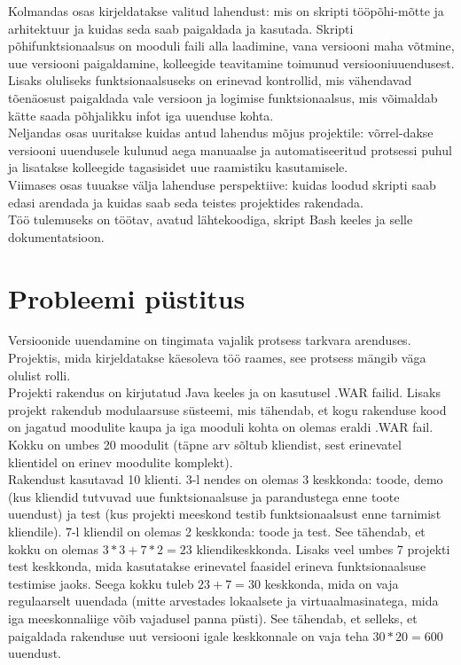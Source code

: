 \documentclass[12pt]{report}
\begin{document}
  Kolmandas osas kirjeldatakse valitud lahendust: mis on skripti tööpõhi-mõtte ja arhitektuur ja kuidas seda saab paigaldada ja kasutada. Skripti põhifunktsionaalsus on mooduli faili alla laadimine, vana versiooni maha võtmine, uue versiooni paigaldamine, kolleegide teavitamine toimunud versiooniuuendusest. Lisaks oluliseks funktsionaalsuseks on erinevad kontrollid, mis vähendavad tõenäosust paigaldada vale versioon ja logimise funktsionaalsus, mis võimaldab kätte saada põhjalikku infot iga uuenduse kohta.\\
  
  Neljandas osas uuritakse kuidas antud lahendus mõjus projektile: võrrel-dakse versiooni uuendusele kulunud aega manuaalse ja automatiseeritud protsessi puhul ja lisatakse kolleegide tagasisidet uue raamistiku kasutamisele.\\
  
  Viimases osas tuuakse välja lahenduse perspektiive: kuidas loodud skripti saab edasi arendada ja kuidas saab seda teistes projektides rakendada.\\
  
  Töö tulemuseks on töötav, avatud lähtekoodiga, skript Bash keeles ja selle dokumentatsioon.
  
  \newpage
  
  \section{Probleemi püstitus}
  
  Versioonide uuendamine on tingimata vajalik protsess tarkvara arenduses. Projektis, mida kirjeldatakse käesoleva töö raames, see protsess mängib väga olulist rolli.\\
  
  Projekti rakendus on kirjutatud Java keeles ja on kasutusel .WAR failid. Lisaks projekt rakendub modulaarsuse süsteemi, mis tähendab, et kogu rakenduse kood on jagatud moodulite kaupa ja iga mooduli kohta on olemas eraldi .WAR fail. Kokku on umbes 20 moodulit (täpne arv sõltub kliendist, sest erinevatel klientidel on erinev moodulite komplekt).\\
  
  Rakendust kasutavad 10 klienti. 3-l nendes on olemas 3 keskkonda: toode, demo (kus kliendid tutvuvad uue funktsionaalsuse ja parandustega enne toote uuendust) ja test (kus projekti meeskond testib funktsionaalsust enne tarnimist kliendile). 7-l kliendil on olemas 2 keskkonda: toode ja test. See tähendab, et kokku on olemas $3*3+7*2=23$ kliendikeskkonda. Lisaks veel umbes 7 projekti test keskkonda, mida kasutatakse erinevatel faasidel erineva funktsionaalsuse testimise jaoks. Seega kokku tuleb $23+7=30$ keskkonda, mida on vaja regulaarselt uuendada (mitte arvestades lokaalsete ja virtuaalmasinatega, mida iga meeskonnaliige võib vajadusel panna püsti). See tähendab, et selleks, et paigaldada rakenduse uut versiooni igale keskkonnale on vaja teha $30*20=600$ uuendust.\\
  
\end{document}
